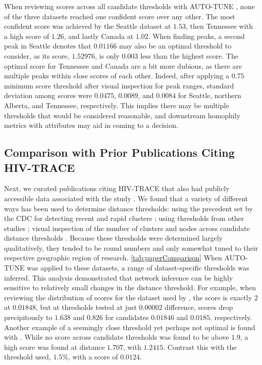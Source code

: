 \documentclass[utf8]{FrontiersinHarvard} %
\newcommand{\TODO}[1]{{\color{red}{#1}}}
\begin{document}
When reviewing scores across all candidate thresholds with AUTO-TUNE
\label{fig:clustuner}, none of the three datasets reached one confident score
over any other. The most confident score was achieved by the Seattle dataset at
$1.53$, then Tennessee with a high score of $1.26$, and lastly Canada at
$1.02$. When finding peaks, a second peak in Seattle denotes that $0.01166$ may
also be an optimal threshold to consider, as its score, $1.52976$, is only
$0.003$ less than the highest score. The optimal score for Tennessee and Canada
are a bit more dubious, as there are multiple peaks within close scores of each
other. Indeed, after applying a $0.75$ minimum score threshold after visual
inspection for peak ranges, standard deviation among scores were $0.0475$,
$0.0089$, and $0.0084$ for Seattle, northern Alberta, and Tennessee,
respectively. This implies there may be multiple thresholds that would be
considered reasonable, and downstream homophily metrics with attributes may aid
in coming to a decision.

\subsection{Comparison with Prior Publications Citing HIV-TRACE}


Next, we curated publications citing HIV-TRACE that also had publicly
accessible data associated with the study \citep{rhee_national_2019,
	brenner_role_2021, h_acquisition_2021, liu_dynamics_2020, bbosa_short_2020,
	yan_central_2020, dalai_combining_2018, sivay_hiv-1_2018}. We found that a
variety of different ways has been used to determine distance thresholds: using
the precedent set by the CDC for detecting recent and rapid clusters
\citep{yan_central_2020}; using thresholds from other studies
\citep{sivay_hiv-1_2018}; visual inspection of the number of clusters and nodes
across candidate distance thresholds \citep{liu_dynamics_2020}. Because these
thresholds were determined largely qualitatively, they tended to be round
numbers and only somewhat tuned to their respective geographic region of
research. \autoref{tab:paperComparison} When AUTO-TUNE was applied to these
datasets, a range of dataset-specific thresholds was inferred. This analysis
demonstrated that network inference can be highly sensitive to relatively small
changes in the distance threshold. For example, when reviewing the distribution
of scores for the dataset used by \citep{dalai_combining_2018}, the score is
exactly $2$ at $0.01848$, but at thresholds tested at just $0.00002$
difference, scores drop precipitously to $1.638$ and $0.826$ for candidates
$0.01846$ and $0.0185$, respectively. Another example of a seemingly close
threshold yet perhaps not optimal is found with \citep{bbosa_short_2020}. While
no score across candidate thresholds was found to be above $1.9$, a high score
was found at distance $1.707$, with $1.2415$. Contrast this with the threshold
used, $1.5\%$, with a score of $0.0124$. \TODO{I would add some specifics here:
	what is $R_12$ and $C$ for those thresholds, for example? The composite score
	is difficult to appreciate intutitvely}
\end{document}
